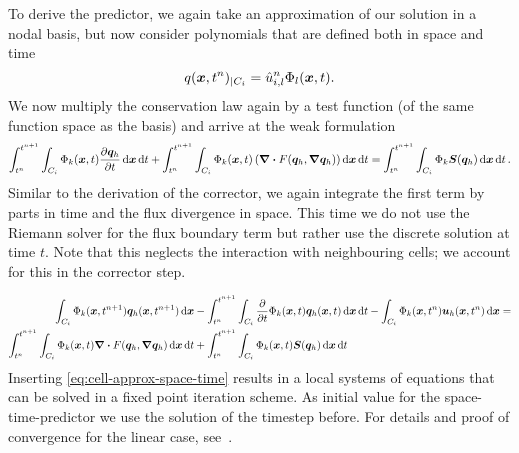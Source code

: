 To derive the predictor, we again take an approximation of our solution in a nodal basis, but now consider polynomials that are defined both in space and time
\begin{equation}
  \label{eq:cell-approx-space-time}
  q(\bm{x}, t^n)_{|\cell[i]} = \hat{u}^n_{i,l} \stbasis{l}(\bm{x}, t).
\end{equation}
We now multiply the conservation law again by a test function (of the same function space as the basis) and arrive at the weak formulation
\begin{equation}\label{eq:weak-pde-space-time}
\intdt{\intdcell{
    \testfunction{k}(\bm{x}, t)
    \pdv{\stpredictor}{t}
}}
+
\intdt{\intdcell{
    \testfunction{k}(\bm{x}, t)
    \left(
      \divergence{\flux(\stpredictor, \gradient{\stpredictor})}
    \right)
}}
=
\intdt{\intdcell{
  \testfunction{k} \source(\stpredictor)
}}.
\end{equation}
Similar to the derivation of the corrector, we again integrate the first term by parts in time and the flux divergence in space.
This time we do not use the Riemann solver for the flux boundary term but rather use the discrete solution at time $t$.
Note that this neglects the interaction with neighbouring cells; we account for this in the corrector step.

\begin{align}\label{eq:space-time-predictor}
\begin{split}
\intdcell{
  \testfunction{k} (\bm{x}, t^{n+1}) \stpredictor(\bm{x}, t^{n+1})
}
&-
\intdt{\intdcell{
    \pdv{}{t} \testfunction{k}(\bm{x}, t) \stpredictor(\bm{x}, t)
}}
-
\intdcell{
  \testfunction{k}(\bm{x},t^n) \dsol(\bm{x}, t^n)
} = \\
\intdt{\intdcell{
    \testfunction{k}(\bm{x},t) \divergence{\flux(\stpredictor, \gradient{\stpredictor})}
}}
&+
\intdt{\intdcell{
    \testfunction{k}(\bm{x}, t) \source(\stpredictor)
}}
\end{split}
\end{align}
Inserting \cref{eq:cell-approx-space-time} results in a local systems of equations that can be solved in a fixed point iteration scheme.
As initial value for the space-time-predictor we use the solution of the timestep before.
For details and proof of convergence for the linear case, see~\cite{dumbser2008unified}.


